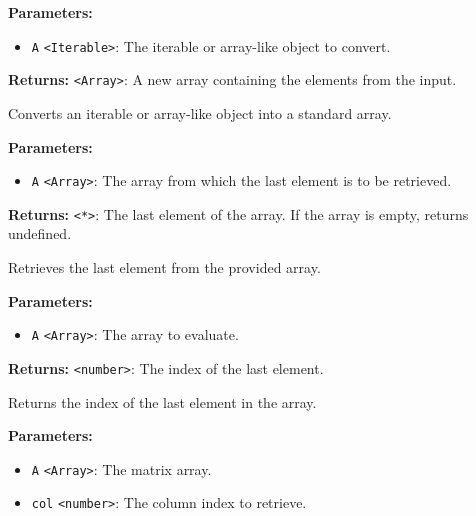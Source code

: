 \documentclass[12pt,a4paper]{article}
\begin{document}
\noindent \textbf{Parameters:}
\begin{itemize}
  \item \texttt{A} \texttt{<Iterable>}: The iterable or array-like object to convert.
\end{itemize}

\noindent \textbf{Returns:} \texttt{<Array>}: A new array containing the elements from the input.

\noindent Converts an iterable or array-like object into a standard array.

\vspace{5mm}
\noindent {}


\noindent \textbf{Parameters:}
\begin{itemize}
  \item \texttt{A} \texttt{<Array>}: The array from which the last element is to be retrieved.
\end{itemize}

\noindent \textbf{Returns:} \texttt{<*>}: The last element of the array. If the array is empty, returns undefined.

\noindent Retrieves the last element from the provided array.

\vspace{5mm}
\noindent {}


\noindent \textbf{Parameters:}
\begin{itemize}
  \item \texttt{A} \texttt{<Array>}: The array to evaluate.
\end{itemize}

\noindent \textbf{Returns:} \texttt{<number>}: The index of the last element.

\noindent Returns the index of the last element in the array.

\vspace{5mm}
\noindent {}


\noindent \textbf{Parameters:}
\begin{itemize}
  \item \texttt{A} \texttt{<Array>}: The matrix array.
  \item \texttt{col} \texttt{<number>}: The column index to retrieve.
\end{itemize}
\end{document}
